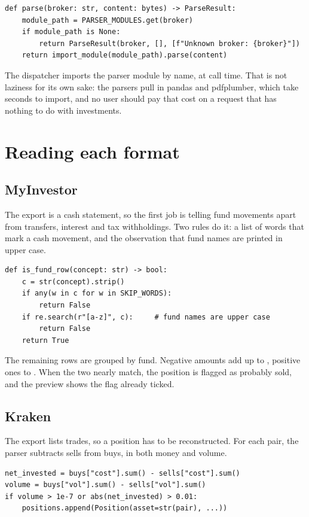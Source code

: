 \begin{lstlisting}[style=py]
def parse(broker: str, content: bytes) -> ParseResult:
    module_path = PARSER_MODULES.get(broker)
    if module_path is None:
        return ParseResult(broker, [], [f"Unknown broker: {broker}"])
    return import_module(module_path).parse(content)
\end{lstlisting}

The dispatcher imports the parser module by name, at call time. That is not
laziness for its own sake: the parsers pull in pandas and pdfplumber, which take
seconds to import, and no user should pay that cost on a request that has
nothing to do with investments.

\section{Reading each format}

\subsection{MyInvestor}

The export is a cash statement, so the first job is telling fund movements apart
from transfers, interest and tax withholdings. Two rules do it: a list of words
that mark a cash movement, and the observation that fund names are printed in
upper case.

\begin{lstlisting}[style=py]
def is_fund_row(concept: str) -> bool:
    c = str(concept).strip()
    if any(w in c for w in SKIP_WORDS):
        return False
    if re.search(r"[a-z]", c):     # fund names are upper case
        return False
    return True
\end{lstlisting}

The remaining rows are grouped by fund. Negative amounts add up to
, positive ones to . When the two nearly match,
the position is flagged as probably sold, and the preview shows the flag already
ticked.

\subsection{Kraken}

The export lists trades, so a position has to be reconstructed. For each pair,
the parser subtracts sells from buys, in both money and volume.

\begin{lstlisting}[style=py]
net_invested = buys["cost"].sum() - sells["cost"].sum()
volume = buys["vol"].sum() - sells["vol"].sum()
if volume > 1e-7 or abs(net_invested) > 0.01:
    positions.append(Position(asset=str(pair), ...))
\end{lstlisting}


